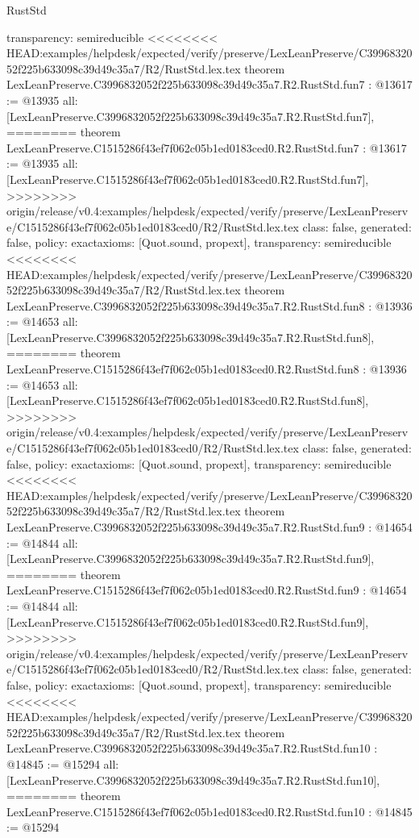 \begin{lexlean}{RustStd}
\begin{coremodule}
{\begin{coremodule}
{{{{{{{{{{  transparency: semireducible
}
<<<<<<<< HEAD:examples/helpdesk/expected/verify/preserve/LexLeanPreserve/C3996832052f225b633098c39d49c35a7/R2/RustStd.lex.tex
theorem LexLeanPreserve.C3996832052f225b633098c39d49c35a7.R2.RustStd.fun7 : @13617 := @13935 {
  all: [LexLeanPreserve.C3996832052f225b633098c39d49c35a7.R2.RustStd.fun7],
========
theorem LexLeanPreserve.C1515286f43ef7f062c05b1ed0183ced0.R2.RustStd.fun7 : @13617 := @13935 {
  all: [LexLeanPreserve.C1515286f43ef7f062c05b1ed0183ced0.R2.RustStd.fun7],
>>>>>>>> origin/release/v0.4:examples/helpdesk/expected/verify/preserve/LexLeanPreserve/C1515286f43ef7f062c05b1ed0183ced0/R2/RustStd.lex.tex
  class: false,
  generated: false,
  policy: exact{axioms: [Quot.sound, propext]},
  transparency: semireducible
}
<<<<<<<< HEAD:examples/helpdesk/expected/verify/preserve/LexLeanPreserve/C3996832052f225b633098c39d49c35a7/R2/RustStd.lex.tex
theorem LexLeanPreserve.C3996832052f225b633098c39d49c35a7.R2.RustStd.fun8 : @13936 := @14653 {
  all: [LexLeanPreserve.C3996832052f225b633098c39d49c35a7.R2.RustStd.fun8],
========
theorem LexLeanPreserve.C1515286f43ef7f062c05b1ed0183ced0.R2.RustStd.fun8 : @13936 := @14653 {
  all: [LexLeanPreserve.C1515286f43ef7f062c05b1ed0183ced0.R2.RustStd.fun8],
>>>>>>>> origin/release/v0.4:examples/helpdesk/expected/verify/preserve/LexLeanPreserve/C1515286f43ef7f062c05b1ed0183ced0/R2/RustStd.lex.tex
  class: false,
  generated: false,
  policy: exact{axioms: [Quot.sound, propext]},
  transparency: semireducible
}
<<<<<<<< HEAD:examples/helpdesk/expected/verify/preserve/LexLeanPreserve/C3996832052f225b633098c39d49c35a7/R2/RustStd.lex.tex
theorem LexLeanPreserve.C3996832052f225b633098c39d49c35a7.R2.RustStd.fun9 : @14654 := @14844 {
  all: [LexLeanPreserve.C3996832052f225b633098c39d49c35a7.R2.RustStd.fun9],
========
theorem LexLeanPreserve.C1515286f43ef7f062c05b1ed0183ced0.R2.RustStd.fun9 : @14654 := @14844 {
  all: [LexLeanPreserve.C1515286f43ef7f062c05b1ed0183ced0.R2.RustStd.fun9],
>>>>>>>> origin/release/v0.4:examples/helpdesk/expected/verify/preserve/LexLeanPreserve/C1515286f43ef7f062c05b1ed0183ced0/R2/RustStd.lex.tex
  class: false,
  generated: false,
  policy: exact{axioms: [Quot.sound, propext]},
  transparency: semireducible
}
<<<<<<<< HEAD:examples/helpdesk/expected/verify/preserve/LexLeanPreserve/C3996832052f225b633098c39d49c35a7/R2/RustStd.lex.tex
theorem LexLeanPreserve.C3996832052f225b633098c39d49c35a7.R2.RustStd.fun10 : @14845 := @15294 {
  all: [LexLeanPreserve.C3996832052f225b633098c39d49c35a7.R2.RustStd.fun10],
========
theorem LexLeanPreserve.C1515286f43ef7f062c05b1ed0183ced0.R2.RustStd.fun10 : @14845 := @15294 {
}}}}}}}}}}}}}}
\end{coremodule}}
\end{coremodule}
\end{lexlean}
